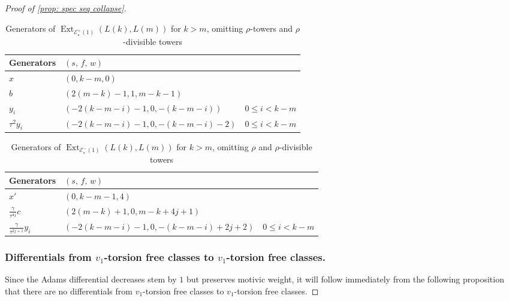 \documentclass[10pt,a4paper]{amsart}
\DeclareMathOperator{\Ext}{Ext}
\newcommand{\cE}{{\mathcal E}}
\begin{document}
\begin{proof}[Proof of \cref{prop: spec seq collapse}]
\begin{table}[h!] 
    \centering
    \begin{tabular}{l |l |l}
            Generators & $(s,\, f,\, w)$ & \\
            \hline
            $x$ & $(0, k-m, 0)$ &  \\
            $b$ & $(2(m-k)-1, 1, m-k-1)$ & \\
            \hline
            $y_{i}$ &{$\left(-2(k-m-i) -1, 0, -(k-m-i)\right)$} &{$0 \le i < k-m$} \\
            $\tau^{2}y_{i}$ & {$\left(-2(k-m-i) -1, 0, -(k-m-i)   - 2\right)$} & {$0 \le i < k-m$}\\
    \end{tabular}
    \caption{Generators of $\Ext_{\cE^{+}_{\star}(1)} (L(k), L(m))$ for $k > m$, omitting $\rho$-towers and $\rho$-divisible towers} 
    \label{tab:Extgens k>m pos}
\end{table}

\begin{table}[h!] 
    \centering
    \begin{tabular}{l |l |l}
            Generators & $(s,\, f,\, w)$ & \\
            \hline
            $x'$  & $(0, k-m-1, 4)$ & {}\\
            $\frac{\gamma}{\tau^{4j}}c$
            & $(2(m-k)+1, 0, m-k + 4j+ 1)$ 
            & {} \\
            \hline
            $\frac{\gamma}{\tau^{2j + 1}}y_{i}$ &{$\left(-2(k-m-i) -1, 0, -(k-m-i) + 2j + 2\right)$} &{$0 \le i < k-m$} \\
            
    \end{tabular}
    \caption{Generators of $\Ext_{\cE^{-}_{\star}(1)} (L(k), L(m))$ for $k > m$, omitting $\rho$ and $\rho$-divisible towers}
    \label{tab:Extgens k>m neg}
\end{table}

\subsubsection{Differentials from $v_{1}$-torsion free classes to $v_{1}$-torsion free classes.}
Since the Adams differential decreases stem by $1$ but preserves motivic weight, it will follow immediately from the following proposition that there are no differentials from $v_{1}$-torsion free classes to $v_{1}$-torsion free classes. 


\end{proof}
\end{document}
